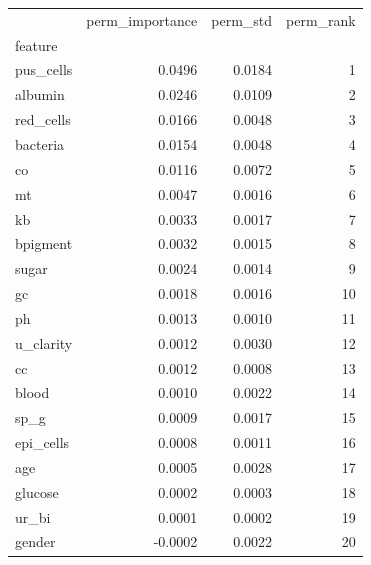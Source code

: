 \begin{tabular}{lrrr}
\toprule
 & perm_importance & perm_std & perm_rank \\
feature &  &  &  \\
\midrule
pus_cells & 0.0496 & 0.0184 & 1 \\
albumin & 0.0246 & 0.0109 & 2 \\
red_cells & 0.0166 & 0.0048 & 3 \\
bacteria & 0.0154 & 0.0048 & 4 \\
co & 0.0116 & 0.0072 & 5 \\
mt & 0.0047 & 0.0016 & 6 \\
kb & 0.0033 & 0.0017 & 7 \\
bpigment & 0.0032 & 0.0015 & 8 \\
sugar & 0.0024 & 0.0014 & 9 \\
gc & 0.0018 & 0.0016 & 10 \\
ph & 0.0013 & 0.0010 & 11 \\
u_clarity & 0.0012 & 0.0030 & 12 \\
cc & 0.0012 & 0.0008 & 13 \\
blood & 0.0010 & 0.0022 & 14 \\
sp_g & 0.0009 & 0.0017 & 15 \\
epi_cells & 0.0008 & 0.0011 & 16 \\
age & 0.0005 & 0.0028 & 17 \\
glucose & 0.0002 & 0.0003 & 18 \\
ur_bi & 0.0001 & 0.0002 & 19 \\
gender & -0.0002 & 0.0022 & 20 \\
\bottomrule
\end{tabular}
